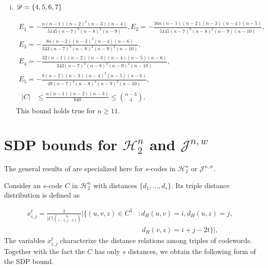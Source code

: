 \documentclass{amsart}
\newcommand{\cH}{\mathcal{H}}
\newcommand{\cJ}{\mathcal{J}}
\begin{document}
{\begin{enumerate}[(i)]
\item $\mathscr{D}=\{4,5,6,7\}$

\begin{gather*}
E_1=-\frac{n(n-1)(n-2)^2(n-3)(n-4)}{5145(n-7)^3(n-8)^2(n-9)},
E_2=-\frac{16n(n-1)(n-2)(n-3)(n-4)(n-5)}{5145(n-7)^3(n-8)^2(n-9)(n-10)},\\
E_3=-\frac{8n(n-2)(n-3)^2(n-4)(n-6)}{343(n-7)^3(n-8)^2(n-9)^2(n-10)},\\
E_4=-\frac{32(n-1)(n-2)(n-3)(n-4)(n-5)(n-6)}{343(n-7)^3(n-8)^3(n-9)^2(n-10)},\\
E_5=-\frac{8(n-2)(n-3)(n-4)^2(n-5)(n-6)}{49(n-7)^4(n-8)^3(n-9)^2(n-10)},\\
\begin{aligned}
|C| &\le \frac{n(n-1)(n-2)(n-3)}{840} \leq \binom{n-3}{4}.
\end{aligned}
\end{gather*}
This bound holds true for $n\ge 11.$

\end{enumerate}

\section{SDP bounds for \texorpdfstring{$\cH_2^n$}. and \texorpdfstring{$\cJ^{n,w}$}.}
\label{sec:SDPbounds}
The general results of \cite{S05} are specialized here for $s$-codes  in $\cH_2^n$ or $\cJ^{n,w}$.
 
Consider an $s$-code $C$ in $\cH_2^n$ with distances $\{d_{1}, \dots, d_{s}\}$. Its triple distance distribution is defined as

\begin{align*}
x_{i, j}^{t} = \frac{1}{|C| \binom{n}{i-t, j-t, t}} |\{ (u, v, z) \in C^{3} &: 
d_H(u, v) = i, d_H(u, z) = j,\\ &\;\; d_H(v,z)=i+j-2t\}|,
\end{align*}
The variables $x_{i,j}^t$ characterize the distance relations among triples of codewords. 
Together with the fact the $C$ has only $s$ distances, we obtain the following form of the SDP bound.

}
\end{document}
